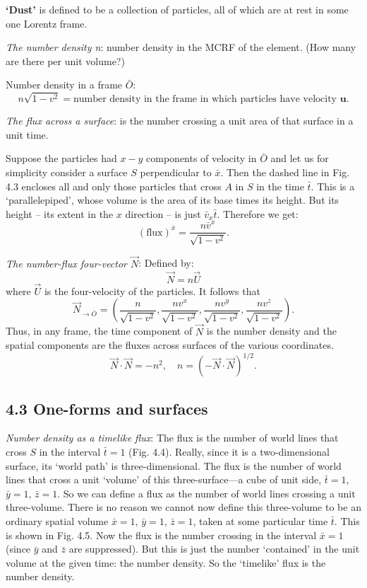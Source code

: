 \documentclass[12pt]{book}
\begin{document}
    \textbf{‘Dust’} is defined to be a collection of particles, all of which are at rest in some one Lorentz frame.

    \textit{The number density n}: number density in the MCRF of the element. (How many are there per unit volume?)
    
    Number density in a frame \(\bar{O}\):
    \[
    n \sqrt{1 - v^2} = \text{number density in the frame in which particles have velocity } \mathbf{u}.
    \tag{4.2}
    \]

    \textit{The flux across a surface}: is the number crossing a unit area of that surface in a unit time. 

    Suppose the particles had $x-y$ components of velocity in \(\bar{O}\) and let us for simplicity consider a surface $S$ perpendicular to $\bar{x}$. Then the dashed line in Fig. 4.3 encloses all and only those particles that cross \(A\) in \(S\) in the time \(\bar{t}\). This is a ‘parallelepiped’, whose volume is the area of its base times its height. But its height – its extent in the \(x\) direction – is just \(\bar{v}_x \bar{t}\). Therefore we get:
    \[
    (\text{flux})^{\bar{x}} = \frac{n \bar{v}^x }{\sqrt{1 - v^2}}.
    \tag{4.3}
    \]

    \textit{The number-flux four-vector $\vec{N}$}: 
    Defined by:
    \[
        \vec{N}=n\vec{U} \tag{4.4}
    \]
    where \(\vec{U}\) is the four-velocity of the particles. It follows that
    \[
    \vec{N}_{\rightarrow \bar{O}} =
    \left(
    \frac{n}{\sqrt{1 - v^2}},
    \frac{n v^x}{\sqrt{1 - v^2}},
    \frac{n v^y}{\sqrt{1 - v^2}},
    \frac{n v^z}{\sqrt{1 - v^2}}
    \right).
    \tag{4.5}
    \]
    Thus, in any frame, the time component of $\vec{N}$ is the number density and the spatial components are the fluxes across surfaces of the various coordinates.
    \[
    \vec{N} \cdot \vec{N} = -n^2, \quad n = \left(-\vec{N} \cdot \vec{N}\right)^{1/2}.     \tag{4.6}
    \]

    \subsection{4.3 One-forms and surfaces}

    \textit{Number density as a timelike flux}: 
    The flux is the number of world lines that cross \(S\) in the interval \(\bar{t} = 1\) (Fig. 4.4). Really, since it is a two-dimensional surface, its ‘world path’ is three-dimensional. The flux is the number of world lines that cross a unit ‘volume’ of this three-surface—a cube of unit side, \(\bar{t} = 1\), \(\bar{y} = 1\), \(\bar{z} = 1\). So we can define a flux as the number of world lines crossing a unit three-volume. There is no reason we cannot now define this three-volume to be an ordinary spatial volume \(\bar{x} = 1\), \(\bar{y} = 1\), \(\bar{z} = 1\), taken at some particular time \(\bar{t}\). This is shown in Fig. 4.5. Now the flux is the number crossing in the interval \(\bar{x} = 1\) (since \(\bar{y}\) and \(\bar{z}\) are suppressed). But this is just the number ‘contained’ in the unit volume at the given time: the number density. So the ‘timelike’ flux is the number density.
\end{document}
